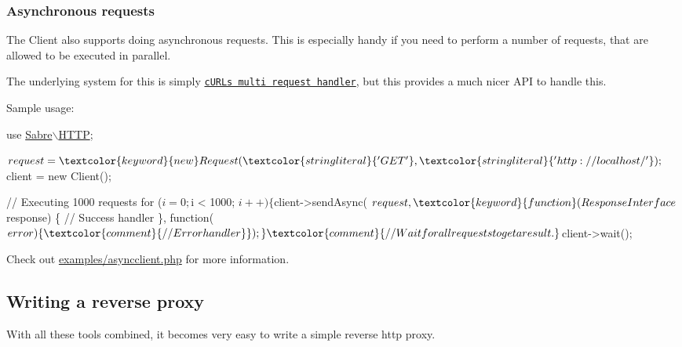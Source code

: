\subsubsection*{Asynchronous requests}

The {\ttfamily Client} also supports doing asynchronous requests. This is especially handy if you need to perform a number of requests, that are allowed to be executed in parallel.

The underlying system for this is simply \href{http://php.net/curl_multi_init}{\tt c\+U\+RL\textquotesingle{}s multi request handler}, but this provides a much nicer A\+PI to handle this.

Sample usage\+:


\begin{DoxyCode}
use \mbox{\hyperlink{namespace_sabre_1_1_h_t_t_p}{Sabre\(\backslash\)HTTP}};

$request = \textcolor{keyword}{new} Request(\textcolor{stringliteral}{'GET'}, \textcolor{stringliteral}{'http://localhost/'});
$client = \textcolor{keyword}{new} Client();

\textcolor{comment}{// Executing 1000 requests}
\textcolor{keywordflow}{for} ($i = 0; $i < 1000; $i++) \{
    $client->sendAsync(
        $request,
        \textcolor{keyword}{function}(ResponseInterface $response) \{
            \textcolor{comment}{// Success handler}
        \},
        \textcolor{keyword}{function}($error) \{
            \textcolor{comment}{// Error handler}
        \}
    ); 
\}

\textcolor{comment}{// Wait for all requests to get a result.}
$client->wait();
\end{DoxyCode}


Check out {\ttfamily \mbox{\hyperlink{asyncclient_8php_source}{examples/asyncclient.\+php}}} for more information.

\subsection*{Writing a reverse proxy }

With all these tools combined, it becomes very easy to write a simple reverse http proxy.


